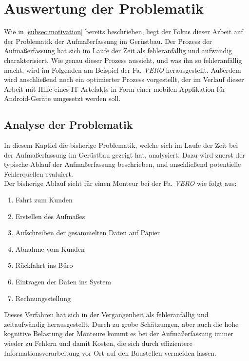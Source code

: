 \chapter{Auswertung der Problematik}
Wie in \autoref{subsec:motivation} bereits beschrieben, liegt der Fokus dieser Arbeit auf der Problematik der Aufmaßerfassung im Gerüstbau.
Der Prozess der Aufmaßerfassung hat sich im Laufe der Zeit als fehleranfällig und aufwändig charakterisiert.
Wie genau dieser Prozess aussieht, und was ihn so fehleranfällig macht, wird im Folgenden am Beispiel der Fa. \emph{VERO} herausgestellt.
Außerdem wird anschließend noch ein optimierter Prozess vorgestellt, der im Verlauf dieser Arbeit mit Hilfe eines IT-Artefakts in Form einer mobilen Applikation für Android-Geräte umgesetzt werden soll. \\

\section{Analyse der Problematik}\label{sec:problem}
In diesem Kaptiel die bisherige Problematik, welche sich im Laufe der Zeit bei der Aufmaßerfassung im Gerüstbau gezeigt hat, analysiert.
Dazu wird zuerst der typische Ablauf der Aufmaßerfassung beschrieben, und anschließend potentielle Fehlerquellen evaluiert. \\
Der bisherige Ablauf sieht für einen Monteur bei der Fa. \emph{VERO} wie folgt aus:

\begin{enumerate}
	\item Fahrt zum Kunden
	\item Erstellen des Aufmaßes
  \item Aufschreiben der gesammelten Daten auf Papier
	\item Abnahme vom Kunden
	\item Rückfahrt ins Büro
	\item Eintragen der Daten ins System
	\item Rechnungsstellung
\end{enumerate}

Dieses Verfahren hat sich in der Vergangenheit als fehleranfällig und zeitaufwändig herausgestellt. 
Durch zu grobe Schätzungen, aber auch die hohe kognitive Belastung der Monteure kommt es bei der Aufmaßerfassung immer wieder zu Fehlern und damit Kosten, die sich durch effizientere Informationsverarbeitung vor Ort auf den Baustellen vermeiden lassen. \\

